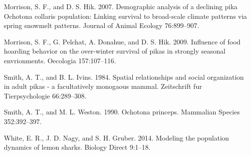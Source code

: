 \documentclass[12pt,]{article}
\begin{document}
\hypertarget{ref-Morrison2007}{}
Morrison, S. F., and D. S. Hik. 2007. Demographic analysis of a
declining pika Ochotona collaris population: Linking survival to
broad-scale climate patterns via spring snowmelt patterns. Journal of
Animal Ecology 76:899--907.

\hypertarget{ref-Morrison2009}{}
Morrison, S. F., G. Pelchat, A. Donahue, and D. S. Hik. 2009. Influence
of food hoarding behavior on the over-winter survival of pikas in
strongly seasonal envrionments. Oecologia 157:107--116.

\hypertarget{ref-Smith1984a}{}
Smith, A. T., and B. L. Ivins. 1984. Spatial relationships and social
organization in adult pikas - a facultatively monogaous mammal.
Zeitschrift fur Tierpsychologie 66:289--308.

\hypertarget{ref-SmithWeston1990}{}
Smith, A. T., and M. L. Weston. 1990. Ochotona princeps. Mammalian
Species 352:392--397.

\hypertarget{ref-White2014}{}
White, E. R., J. D. Nagy, and S. H. Gruber. 2014. Modeling the
population dynamics of lemon sharks. Biology Direct 9:1--18.
\end{document}
